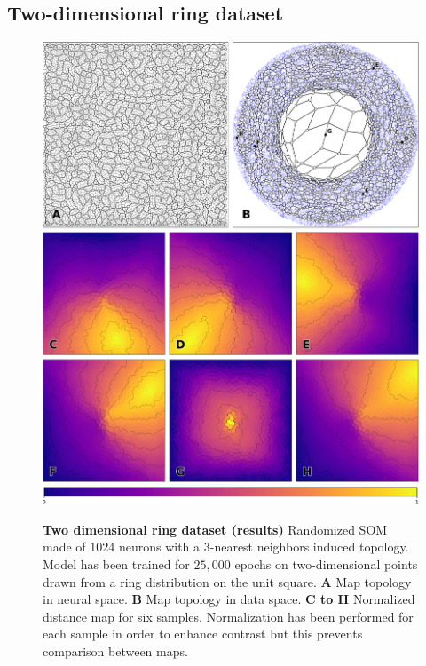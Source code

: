 \subsection{Two-dimensional ring dataset }

\begin{figure}
  \includegraphics[width=\columnwidth]{experiment-2D-torus.pdf}
  \vspace{2mm}
  \centering
  \includegraphics[width=.975\columnwidth]{figures/colormap.pdf}
  \caption{%
  {\bfseries \sffamily Two dimensional ring dataset (results)}
  Randomized SOM made of $1024$ neurons with a $3$-nearest neighbors induced topology. Model has been trained for $25,000$ epochs on two-dimensional points drawn from a ring distribution on the unit square. \textbf{A} Map topology in neural space. \textbf{B} Map topology in data space. \textbf{C to H} Normalized distance map for six samples. Normalization has been performed for each sample in order to enhance contrast but this prevents comparison between maps.
  }
  \label{fig:2D-ring:results}
\end{figure}


